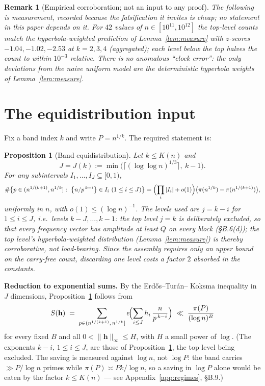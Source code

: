 \documentclass[11pt]{article}
\newtheorem{proposition}[theorem]{Proposition}
\newtheorem{remark}[theorem]{Remark}
\theoremstyle{definition}
\theoremstyle{plain}
\newcommand{\fpart}[1]{\left\{#1\right\}}
\begin{document}
\begin{remark}[Empirical corroboration; not an input to any proof]
\label{rem:numerics}
The following is measurement, recorded because the falsification it
invites is cheap; no statement in this paper depends on it.  For $42$
values of $n\in[10^{11},10^{12}]$ the top-level counts match the
hyperbola-weighted prediction of Lemma~\ref{lem:measure} with $z$-scores
$-1.04,-1.02,-2.53$ at $k=2,3,4$ (aggregated); each level below the top
halves the count to within $10^{-3}$ relative.  There is no anomalous
``clock error'': the only deviations from the naive uniform model are the
deterministic hyperbola weights of Lemma~\ref{lem:measure}.
\end{remark}

\section{The equidistribution input}\label{sec:equi}

Fix a band index $k$ and write $P=n^{1/k}$.  The required statement is:

\begin{proposition}[Band equidistribution]\label{prop:equi}
Let $k\le K(n)$ and
\[
J=J(k):=\min\bigl(\lceil(\log\log n)^{1/3}\rceil,\ k-1\bigr).
\]
For any subintervals $I_1,\dots,I_J\subseteq[0,1)$,
\[
\#\bigl\{p\in(n^{1/(k+1)},n^{1/k}]:\ \fpart{n/p^{\,k-i}}\in I_i\ (1\le i\le J)\bigr\}
=\Bigl(\prod_i|I_i|+o(1)\Bigr)\bigl(\pi(n^{1/k})-\pi(n^{1/(k+1)})\bigr),
\]
uniformly in $n$, with $o(1)\le(\log n)^{-1}$.  The levels used are
$j=k-i$ for $1\le i\le J$, i.e.\ levels $k-J,\dots,k-1$: the top level
$j=k$ is deliberately \emph{excluded}, so that every frequency vector
has amplitude at least $Q$ on every block (\S B.6(d)); the top level's
hyperbola-weighted distribution (Lemma~\ref{lem:measure}) is thereby
corroborative, not load-bearing.  Since the assembly requires only an
upper bound on the carry-free count, discarding one level costs a
factor $2$ absorbed in the constants.
\end{proposition}

\noindent\textbf{Reduction to exponential sums.}  By the Erd\H{o}s--Tur\'an--
Koksma inequality in $J$ dimensions, Proposition~\ref{prop:equi} follows from
\begin{equation}\label{eq:weyl}
S(\mathbf h)\;=\;\sum_{p\in(n^{1/(k+1)},\,n^{1/k}]}
e\!\Bigl(\sum_{i\le J} h_i\,\frac{n}{p^{\,k-i}}\Bigr)\;\ll\;
\frac{\pi(P)}{(\log n)^{B}}
\end{equation}
for every fixed $B$ and all $0<\|\mathbf h\|_\infty\le H$, with $H$ a
small power of $\log$.  (The exponents $k-i$, $1\le i\le J$, are those of
Proposition~\ref{prop:equi}, the top level being excluded.  The saving is
measured against $\log n$, not $\log P$: the band carries
$\gg P/\log n$ primes while $\pi(P)\asymp Pk/\log n$, so a saving in
$\log P$ alone would be eaten by the factor $k\le K(n)$ --- see
Appendix~\ref{app:regimes}, \S B.9.)
\end{document}
